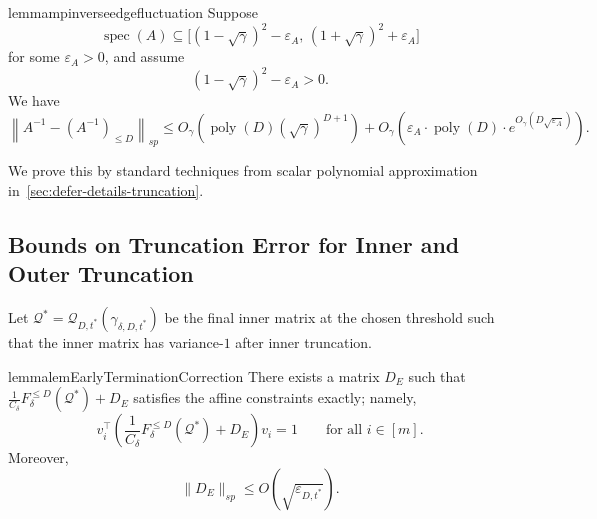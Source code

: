 \documentclass[12pt]{article}
\newtheorem{lemma}[theorem]{Lemma}
\newcommand{\poly}{\operatorname{poly}}
\newcommand{\calQ}{\mathcal{Q}}
\newcommand{\gam}{\gamma}
\begin{document}
\begin{restatable}{lemma}{mpinverseedgefluctuation} \label{lem:mp-inverse-edge-thickening} Suppose \[ \operatorname{spec}(A) \subseteq \bigl[(1-\sqrt{\gam})^2-\varepsilon_A,\, (1+\sqrt{\gam})^2+\varepsilon_A\bigr] \] for some \(\varepsilon_A>0\), and assume \[ (1-\sqrt{\gam})^2-\varepsilon_A>0. \]  We have\[ \left\| A^{-1}-(A^{-1})_{\le D} \right\|_{sp} \le O_\gam\!\left(\poly(D) (\sqrt{\gam})^{D+1}\right) + O_\gam\!\left( \varepsilon_A \cdot  \poly(D) \cdot  e^{O_\gam(D\sqrt{\varepsilon_A})} \right). \] \end{restatable}
We prove this by standard techniques from scalar polynomial approximation in~\cref{sec:defer-details-truncation}.



\subsection{Bounds on Truncation Error for Inner and Outer Truncation}
Let $\calQ^*= \calQ_{D,t^*}(\gamma_{\delta,D,t^*})$ be the final inner matrix at the chosen threshold such that the inner matrix has variance-$1$ after inner truncation.
\begin{restatable}{lemma}{lemEarlyTerminationCorrection}
\label{lem:early-termination-correction}
There exists a matrix \(D_E\) such that
\(
    \frac{1}{C_\delta}F_\delta^{\le D}(\calQ^*)+D_E
\)
satisfies the affine constraints exactly; namely,
\[
    v_i^\top
    \left(
        \frac{1}{C_\delta}F_\delta^{\le D}(\calQ^*)+D_E
    \right)
    v_i
    =
    1
    \qquad \text{for all } i\in[m].
\]
Moreover,
\[
    \|D_E\|_{sp}
    \le
    O\!\left(\sqrt{\varepsilon_{D,t^*}}\right).
\]
\end{restatable}
\end{document}
